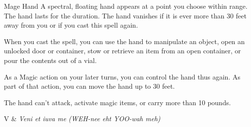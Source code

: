 \begin{Spell}[
  level=Cantrip,
  time=1 Action,
  range=30 ft,
  components={V, S},
  duration=1 Minute,
  school=Conjuration,
  attack=None,
  effect=Utility
]{Mage Hand}
A spectral, floating hand appears at a point you choose within range. The hand lasts for the duration. The hand vanishes if it is ever more than 30 feet away from you or if you cast this spell again.

When you cast the spell, you can use the hand to manipulate an object, open an unlocked door or container, stow or retrieve an item from an open container, or pour the contents out of a vial.

As a Magic action on your later turns, you can control the hand thus again. As part of that action, you can move the hand up to 30 feet.

The hand can't attack, activate magic items, or carry more than 10 pounds.

\begin{components}
V & \textit{Veni et iuva me (WEH-nee eht YOO-wah meh)}
\end{components}
\end{Spell}


